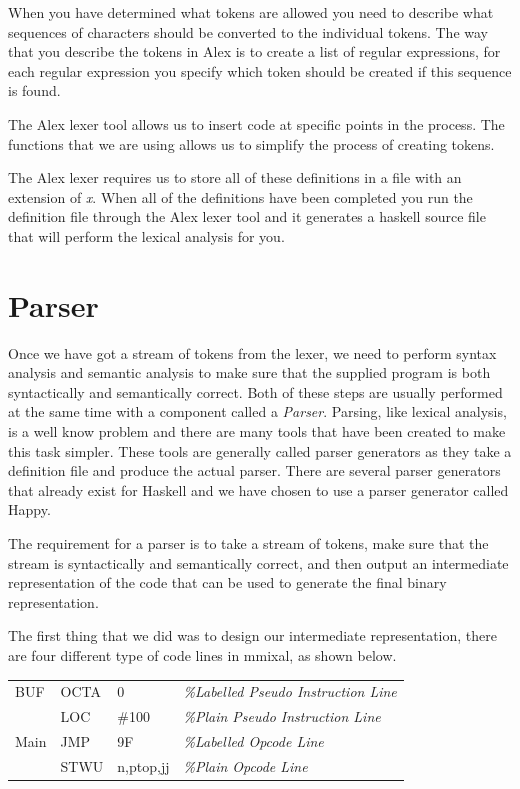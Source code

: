 \documentclass[a4paper,11pt]{report}
\begin{document}
When you have determined what tokens are allowed you need to describe what sequences of characters should be converted to the individual tokens. The way that you describe the tokens in Alex is to create a list of regular expressions, for each regular expression you specify which token should be created if this sequence is found.

The Alex lexer tool allows us to insert code at specific points in the process. The functions that we are using allows us to simplify the process of creating tokens.

The Alex lexer requires us to store all of these definitions in a file with an extension of \textit{x}. When all of the definitions have been completed you run the definition file through the Alex lexer tool and it generates a haskell source file that will perform the lexical analysis for you.
\section{Parser}\label{sec:parser}
Once we have got a stream of tokens from the lexer, we need to perform syntax analysis and semantic analysis to make sure that the supplied program is both syntactically and semantically correct. Both of these steps are usually performed at the same time with a component called a \textit{Parser}. Parsing, like lexical analysis, is a well know problem and there are many tools that have been created to make this task simpler. These tools are generally called parser generators as they take a definition file and produce the actual parser. There are several parser generators that already exist for Haskell and we have chosen to use a parser generator called Happy\cite{happy}.

The requirement for a parser is to take a stream of tokens, make sure that the stream is syntactically and semantically correct, and then output an intermediate representation of the code that can be used to generate the final binary representation.

The first thing that we did was to design our intermediate representation, there are four different type of code lines in mmixal, as shown below.

\begin{centering}
\begin{tabular}{ l l l l }
BUF & OCTA & 0 & \textit{\%Labelled Pseudo Instruction Line}\\
 & LOC & \#100 & \textit{\%Plain Pseudo Instruction Line}\\
Main & JMP & 9F & \textit{\%Labelled Opcode Line}\\
 & STWU & n,ptop,jj & \textit{\%Plain Opcode Line}\\
\end{tabular}
\end{centering}
\end{document}
